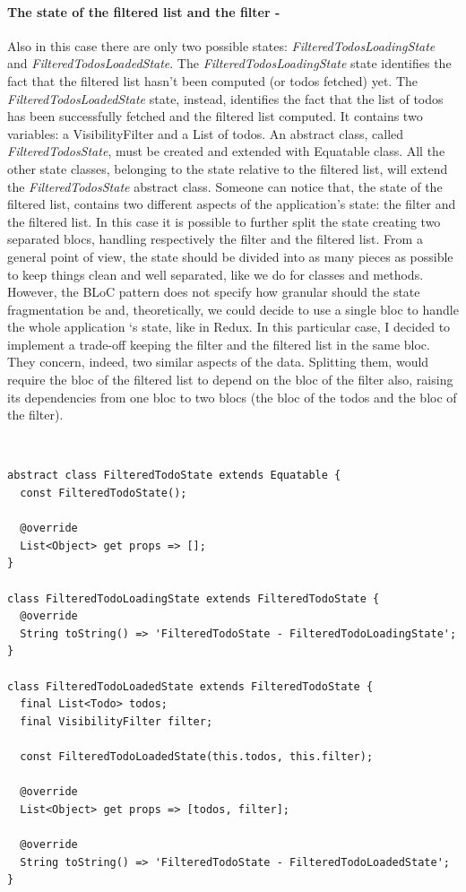 \paragraph{The state of the filtered list and the filter - }
\label{subpar:todo_app_bloc_core_state}
Also in this case there are only two possible states: \textit{FilteredTodosLoadingState} and \textit{FilteredTodosLoadedState}. The \textit{FilteredTodosLoadingState} state identifies the fact that the filtered list hasn’t been computed (or todos fetched) yet. The  \textit{FilteredTodosLoadedState} state, instead,  identifies the fact that the list of todos has been successfully fetched and the filtered list computed. It contains two variables: a VisibilityFilter and a List of todos. An abstract class,  called \textit{FilteredTodosState}, must be created and extended with Equatable class. All the other state classes, belonging to the state relative to the filtered list, will extend the \textit{FilteredTodosState} abstract class. Someone can notice that,  the state of the filtered list, contains two different aspects of the application's state: the filter and the filtered list. In this case it is possible to further split the state creating two separated blocs, handling respectively the filter and the filtered list. From a general point of view, the state should be divided into as many pieces as possible to keep things clean and well separated,  like we do for classes and methods. However, the BLoC pattern does not specify how granular should the state fragmentation be and,  theoretically, we could decide to use a single bloc to handle the whole application ‘s state,  like in Redux. In this particular case,  I decided to implement a trade-off keeping the filter and the filtered list in the same bloc. They concern,  indeed, two similar aspects of the data. Splitting them,  would require the bloc of the filtered list to depend on the bloc of the filter also, raising its dependencies from one bloc to two blocs (the bloc of the todos and the bloc of the filter).
\begin{code}
\mbox{}\\
 \mbox{}
\label{code:2.14}
\begin{verbatim}
abstract class FilteredTodoState extends Equatable {
  const FilteredTodoState();

  @override
  List<Object> get props => [];
}

class FilteredTodoLoadingState extends FilteredTodoState {
  @override
  String toString() => 'FilteredTodoState - FilteredTodoLoadingState';
}

class FilteredTodoLoadedState extends FilteredTodoState {
  final List<Todo> todos;
  final VisibilityFilter filter;

  const FilteredTodoLoadedState(this.todos, this.filter);

  @override
  List<Object> get props => [todos, filter];

  @override
  String toString() => 'FilteredTodoState - FilteredTodoLoadedState';
}
\end{verbatim}
\mbox{}
\end{code}

